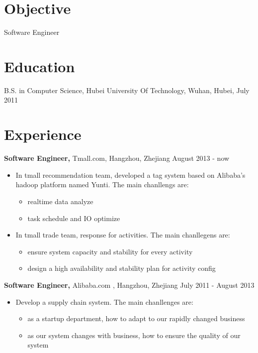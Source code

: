 \documentclass[margin]{res}
\begin{document}
 
 
 

\address{{\bf Contact Info}  Tel:(086)18698580235  E-mail:kenvifly@gmail.com }

 
\begin{resume} 
 
\section{Objective} 
Software Engineer

\section{Education} 
B.S. in Computer Science, Hubei University Of Technology, Wuhan, Hubei, July 2011 \\

 

\section{Experience}
 {\bf Software Engineer,} Tmall.com, Hangzhou, Zhejiang \hfill August  2013 - now
 \begin{itemize} \itemsep -2pt  %
 \item In tmall recommendation team, developed a tag system based on  Alibaba's hadoop platform named Yunti. The main chanllengs are:
	\begin{itemize}
		\item realtime data analyze
		\item task schedule and IO optimize
     \end{itemize}
 \item In tmall trade team, response for activities. The main chanllegens are:
	\begin{itemize}
          \item ensure system capacity and stability for every activity
          \item design a high availability and stability plan for activity config
     \end{itemize}
 \end{itemize}

 
 
{\bf Software Engineer,} Alibaba.com , Hangzhou, Zhejiang  \hfill  July 2011 - August 2013
\begin{itemize} \itemsep -2pt %
\item Develop a supply chain system. The main chanllenges are:
    \begin{itemize}
         \item as a startup department, how to adapt to our rapidly changed business
         \item as our system changes with business, how to ensure the quality of our system
    \end{itemize}
\end{itemize}


\end{resume}
\end{document}
